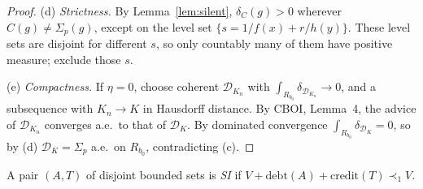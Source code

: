 \documentclass[11pt]{article}
\theoremstyle{definition}\newtheorem{definition}[theorem]{Definition}
\theoremstyle{remark}\newtheorem{remark}[theorem]{Remark}
\newcommand{\Dscr}{\mathcal D}
\newcommand{\debt}{\mathrm{debt}}
\newcommand{\cred}{\mathrm{credit}}
\begin{document}
\begin{proof}
(d) \emph{Strictness.} By Lemma~\ref{lem:silent}, $\delta_C(g)>0$ wherever
$C(g)\ne\Sigma_p(g)$, except on the level set $\{s=1/f(x)+r/h(y)\}$. These
level sets are disjoint for different $s$, so only countably many of them
have positive measure; exclude those $s$.

(e) \emph{Compactness.} If $\eta=0$, choose coherent $\Dscr_{K_n}$ with
$\int_{R_{b_0}}\delta_{\Dscr_{K_n}}\to0$, and a subsequence with $K_n\to K$
in Hausdorff distance. By CBOI, Lemma~4, the advice of $\Dscr_{K_n}$ converges
a.e.\ to that of $\Dscr_K$. By dominated convergence
$\int_{R_{b_0}}\delta_{\Dscr_K}=0$, so by (d) $\Dscr_K=\Sigma_p$ a.e.\ on
$R_{b_0}$, contradicting (c).
\end{proof}

A pair $(A,T)$ of disjoint bounded sets is \emph{SI} if
$V+\debt(A)+\cred(T)\prec_1V$.
\end{document}
